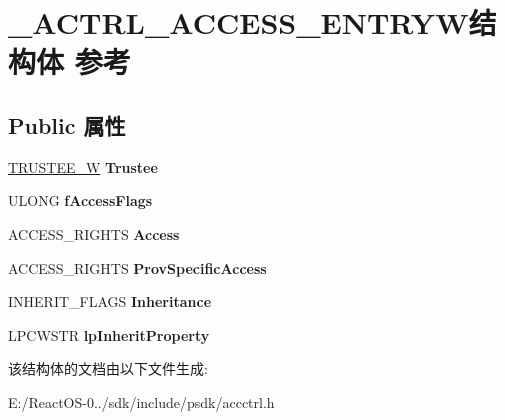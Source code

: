 \hypertarget{struct___a_c_t_r_l___a_c_c_e_s_s___e_n_t_r_y_w}{}\section{\+\_\+\+A\+C\+T\+R\+L\+\_\+\+A\+C\+C\+E\+S\+S\+\_\+\+E\+N\+T\+R\+Y\+W结构体 参考}
\label{struct___a_c_t_r_l___a_c_c_e_s_s___e_n_t_r_y_w}
\subsection*{Public 属性}
\begin{DoxyCompactItemize}
\item 
\mbox{\label{struct___a_c_t_r_l___a_c_c_e_s_s___e_n_t_r_y_w_a3c829dd17b25fb9154ecca83122665af}} 
\hyperlink{struct___t_r_u_s_t_e_e___w}{T\+R\+U\+S\+T\+E\+E\+\_\+W} {\bfseries Trustee}
\item 
\mbox{\label{struct___a_c_t_r_l___a_c_c_e_s_s___e_n_t_r_y_w_a87255094dc1151c5ad0ca2b7eaaea523}} 
U\+L\+O\+NG {\bfseries f\+Access\+Flags}
\item 
\mbox{\label{struct___a_c_t_r_l___a_c_c_e_s_s___e_n_t_r_y_w_a6eb2ee22ee8f93e7ed3c850b3909063c}} 
A\+C\+C\+E\+S\+S\+\_\+\+R\+I\+G\+H\+TS {\bfseries Access}
\item 
\mbox{\label{struct___a_c_t_r_l___a_c_c_e_s_s___e_n_t_r_y_w_a224a74b607298e5db695873bb5845d51}} 
A\+C\+C\+E\+S\+S\+\_\+\+R\+I\+G\+H\+TS {\bfseries Prov\+Specific\+Access}
\item 
\mbox{\label{struct___a_c_t_r_l___a_c_c_e_s_s___e_n_t_r_y_w_ac165081c0c0c06fc6ae9db39c40bec3f}} 
I\+N\+H\+E\+R\+I\+T\+\_\+\+F\+L\+A\+GS {\bfseries Inheritance}
\item 
\mbox{\label{struct___a_c_t_r_l___a_c_c_e_s_s___e_n_t_r_y_w_ae24b356ecc8b235d94f155a64a2c178b}} 
L\+P\+C\+W\+S\+TR {\bfseries lp\+Inherit\+Property}
\end{DoxyCompactItemize}


该结构体的文档由以下文件生成\+:\begin{DoxyCompactItemize}
\item 
E\+:/\+React\+O\+S-\/0../sdk/include/psdk/accctrl.\+h\end{DoxyCompactItemize}
